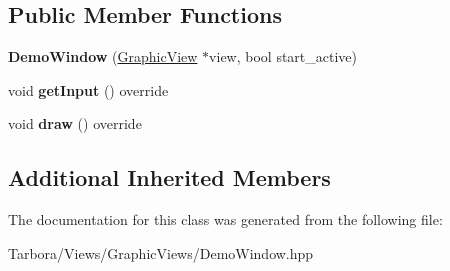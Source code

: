 \subsection*{Public Member Functions}
\begin{DoxyCompactItemize}
\item 
\mbox{\label{classTarbora_1_1DemoWindow_a20c62ad3f1602152c50efcb1e2c3b16d}} 
{\bfseries Demo\+Window} (\hyperlink{classTarbora_1_1GraphicView}{Graphic\+View} $\ast$view, bool start\+\_\+active)
\item 
\mbox{\label{classTarbora_1_1DemoWindow_a8537497b035002c4adcf3c2ab97069f1}} 
void {\bfseries get\+Input} () override
\item 
\mbox{\label{classTarbora_1_1DemoWindow_a88b0354686e440a7bd783ccf33dafe6a}} 
void {\bfseries draw} () override
\end{DoxyCompactItemize}
\subsection*{Additional Inherited Members}


The documentation for this class was generated from the following file\+:\begin{DoxyCompactItemize}
\item 
Tarbora/\+Views/\+Graphic\+Views/Demo\+Window.\+hpp\end{DoxyCompactItemize}
